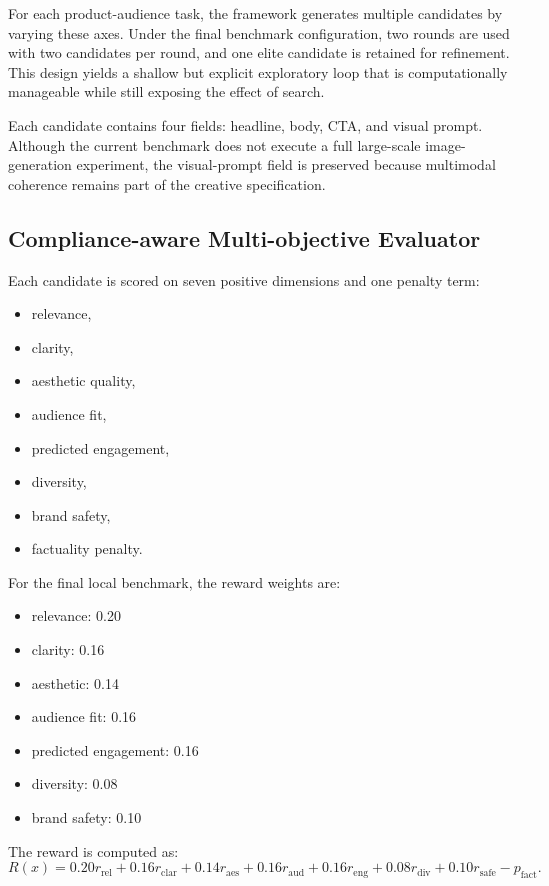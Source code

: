 \documentclass[preprint,12pt]{elsarticle}
\begin{document}
For each product-audience task, the framework generates multiple candidates by varying these axes. Under the final benchmark configuration, two rounds are used with two candidates per round, and one elite candidate is retained for refinement. This design yields a shallow but explicit exploratory loop that is computationally manageable while still exposing the effect of search.

Each candidate contains four fields: headline, body, CTA, and visual prompt. Although the current benchmark does not execute a full large-scale image-generation experiment, the visual-prompt field is preserved because multimodal coherence remains part of the creative specification.

\subsection{Compliance-aware Multi-objective Evaluator}

Each candidate is scored on seven positive dimensions and one penalty term:
\begin{itemize}[leftmargin=1.5em]
    \item relevance,
    \item clarity,
    \item aesthetic quality,
    \item audience fit,
    \item predicted engagement,
    \item diversity,
    \item brand safety,
    \item factuality penalty.
\end{itemize}

For the final local benchmark, the reward weights are:
\begin{itemize}[leftmargin=1.5em]
    \item relevance: 0.20
    \item clarity: 0.16
    \item aesthetic: 0.14
    \item audience fit: 0.16
    \item predicted engagement: 0.16
    \item diversity: 0.08
    \item brand safety: 0.10
\end{itemize}

The reward is computed as:
\[
R(x)=0.20r_{\mathrm{rel}}+0.16r_{\mathrm{clar}}+0.14r_{\mathrm{aes}}+0.16r_{\mathrm{aud}}+0.16r_{\mathrm{eng}}+0.08r_{\mathrm{div}}+0.10r_{\mathrm{safe}}-p_{\mathrm{fact}}.
\]
\end{document}
